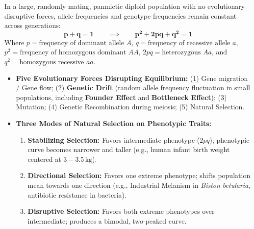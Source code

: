 \documentclass[10pt,a4paper]{article}
\begin{document}
\begin{formulabox}
In a large, randomly mating, panmictic diploid population with no evolutionary disruptive forces, allele frequencies and genotype frequencies remain constant across generations:
\begin{equation}
  \mathbf{p + q = 1} \qquad \implies \qquad \mathbf{p^2 + 2pq + q^2 = 1}
\end{equation}
Where $p = \text{frequency of dominant allele } A$, $q = \text{frequency of recessive allele } a$, $p^2 = \text{frequency of homozygous dominant } AA$, $2pq = \text{heterozygous } Aa$, and $q^2 = \text{homozygous recessive } aa$.
\begin{itemize}[leftmargin=*]
  \item \textbf{Five Evolutionary Forces Disrupting Equilibrium:} (1) Gene migration / Gene flow; (2) \textbf{Genetic Drift} (random allele frequency fluctuation in small populations, including \textbf{Founder Effect} and \textbf{Bottleneck Effect}); (3) Mutation; (4) Genetic Recombination during meiosis; (5) Natural Selection.
  \item \textbf{Three Modes of Natural Selection on Phenotypic Traits:}
  \begin{enumerate}
    \item \textbf{Stabilizing Selection:} Favors intermediate phenotype ($2pq$); phenotypic curve becomes narrower and taller (e.g., human infant birth weight centered at $3-3.5\,\mathrm{kg}$).
    \item \textbf{Directional Selection:} Favors one extreme phenotype; shifts population mean towards one direction (e.g., Industrial Melanism in \textit{Biston betularia}, antibiotic resistance in bacteria).
    \item \textbf{Disruptive Selection:} Favors both extreme phenotypes over intermediate; produces a bimodal, two-peaked curve.
  \end{enumerate}
\end{itemize}
\end{formulabox}
\end{document}
